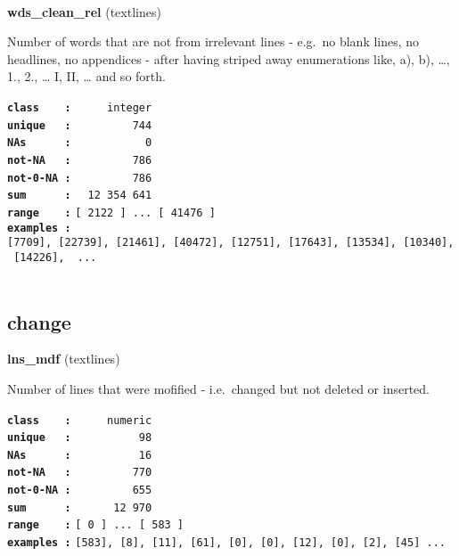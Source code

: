 \documentclass[]{article}
\begin{document}
~

\textbf{wds\_clean\_rel} (textlines)

Number of words that are not from irrelevant lines - e.g.~no blank
lines, no headlines, no appendices - after having striped away
enumerations like, a), b), \ldots{}, 1., 2., \ldots{} I, II, \ldots{}
and so forth.

\textbf{\texttt{class\ \ \ \ :}} \texttt{~~~~~integer}\\
\textbf{\texttt{unique\ \ \ :}} \texttt{~~~~~~~~~744}\\
\textbf{\texttt{NAs\ \ \ \ \ \ :}} \texttt{~~~~~~~~~~~0}\\
\textbf{\texttt{not-NA\ \ \ :}} \texttt{~~~~~~~~~786}\\
\textbf{\texttt{not-0-NA\ :}} \texttt{~~~~~~~~~786}\\
\textbf{\texttt{sum\ \ \ \ \ \ :}} \texttt{~~12~354~641}\\
\textbf{\texttt{range\ \ \ \ :}}
\texttt{{[}\ 2122\ {]}\ ...\ {[}\ 41476\ {]}}\\
\textbf{\texttt{examples\ :}}
\texttt{{[}7709{]},\ {[}22739{]},\ {[}21461{]},\ {[}40472{]},\ {[}12751{]},\ {[}17643{]},\ {[}13534{]},\ {[}10340{]},\ {[}14226{]},\ \ ...}\\

~

\subsection{change}\label{change}

\textbf{lns\_mdf} (textlines)

Number of lines that were mofified - i.e.~changed but not deleted or
inserted.

\textbf{\texttt{class\ \ \ \ :}} \texttt{~~~~~numeric}\\
\textbf{\texttt{unique\ \ \ :}} \texttt{~~~~~~~~~~98}\\
\textbf{\texttt{NAs\ \ \ \ \ \ :}} \texttt{~~~~~~~~~~16}\\
\textbf{\texttt{not-NA\ \ \ :}} \texttt{~~~~~~~~~770}\\
\textbf{\texttt{not-0-NA\ :}} \texttt{~~~~~~~~~655}\\
\textbf{\texttt{sum\ \ \ \ \ \ :}} \texttt{~~~~~~12~970}\\
\textbf{\texttt{range\ \ \ \ :}}
\texttt{{[}\ 0\ {]}\ ...\ {[}\ 583\ {]}}\\
\textbf{\texttt{examples\ :}}
\texttt{{[}583{]},\ {[}8{]},\ {[}11{]},\ {[}61{]},\ {[}0{]},\ {[}0{]},\ {[}12{]},\ {[}0{]},\ {[}2{]},\ {[}45{]}\ ...}\\
\end{document}
